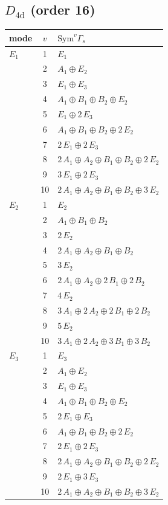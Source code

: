 \documentclass[11pt]{article}
\begin{document}
\subsection*{$D_{4\mathrm{d}}$ \quad (order 16)}
\begin{longtable}{l c p{}}
\hline mode & $v$ & $\mathrm{Sym}^v\Gamma_s$\\ \hline\endhead
$E_{1}$ & 1 & $E_{1}$\\
 & 2 & $A_{1}\oplus E_{2}$\\
 & 3 & $E_{1}\oplus E_{3}$\\
 & 4 & $A_{1}\oplus B_{1}\oplus B_{2}\oplus E_{2}$\\
 & 5 & $E_{1}\oplus 2\,E_{3}$\\
 & 6 & $A_{1}\oplus B_{1}\oplus B_{2}\oplus 2\,E_{2}$\\
 & 7 & $2\,E_{1}\oplus 2\,E_{3}$\\
 & 8 & $2\,A_{1}\oplus A_{2}\oplus B_{1}\oplus B_{2}\oplus 2\,E_{2}$\\
 & 9 & $3\,E_{1}\oplus 2\,E_{3}$\\
 & 10 & $2\,A_{1}\oplus A_{2}\oplus B_{1}\oplus B_{2}\oplus 3\,E_{2}$\\
\hline
$E_{2}$ & 1 & $E_{2}$\\
 & 2 & $A_{1}\oplus B_{1}\oplus B_{2}$\\
 & 3 & $2\,E_{2}$\\
 & 4 & $2\,A_{1}\oplus A_{2}\oplus B_{1}\oplus B_{2}$\\
 & 5 & $3\,E_{2}$\\
 & 6 & $2\,A_{1}\oplus A_{2}\oplus 2\,B_{1}\oplus 2\,B_{2}$\\
 & 7 & $4\,E_{2}$\\
 & 8 & $3\,A_{1}\oplus 2\,A_{2}\oplus 2\,B_{1}\oplus 2\,B_{2}$\\
 & 9 & $5\,E_{2}$\\
 & 10 & $3\,A_{1}\oplus 2\,A_{2}\oplus 3\,B_{1}\oplus 3\,B_{2}$\\
\hline
$E_{3}$ & 1 & $E_{3}$\\
 & 2 & $A_{1}\oplus E_{2}$\\
 & 3 & $E_{1}\oplus E_{3}$\\
 & 4 & $A_{1}\oplus B_{1}\oplus B_{2}\oplus E_{2}$\\
 & 5 & $2\,E_{1}\oplus E_{3}$\\
 & 6 & $A_{1}\oplus B_{1}\oplus B_{2}\oplus 2\,E_{2}$\\
 & 7 & $2\,E_{1}\oplus 2\,E_{3}$\\
 & 8 & $2\,A_{1}\oplus A_{2}\oplus B_{1}\oplus B_{2}\oplus 2\,E_{2}$\\
 & 9 & $2\,E_{1}\oplus 3\,E_{3}$\\
 & 10 & $2\,A_{1}\oplus A_{2}\oplus B_{1}\oplus B_{2}\oplus 3\,E_{2}$\\
\hline
\end{longtable}
\end{document}
